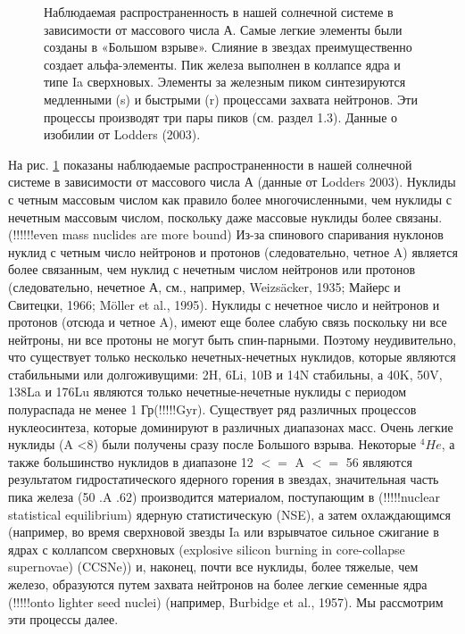 \documentclass[%
bachelor,    %
natbib,      %
subf,        %
href,        %
colorlinks,  %
]{disser}
\begin{document}
\begin{figure}[h]
	\caption{Наблюдаемая распространенность в нашей солнечной системе в зависимости от массового числа А. Самые легкие элементы были созданы в «Большом взрыве». Слияние в звездах преимущественно создает альфа-элементы. Пик железа выполнен в коллапсе ядра и типе Ia сверхновых. Элементы за железным пиком синтезируются медленными (s) и быстрыми (r) процессами захвата нейтронов. Эти процессы производят три пары пиков (см. раздел 1.3). Данные о изобилии от Lodders (2003).}
	\label{ris:1}
\end{figure}

На рис. \ref{ris:1} показаны наблюдаемые распространенности в нашей солнечной системе в зависимости от массового числа А (данные от Lodders 2003). Нуклиды с четным массовым числом как правило более многочисленными, чем нуклиды с нечетным массовым числом, поскольку даже массовые нуклиды более связаны. (!!!!!!even mass nuclides are more bound) Из-за спинового спаривания нуклонов нуклид с четным число нейтронов и протонов (следовательно, четное A) является более связанным, чем нуклид с нечетным числом нейтронов или протонов (следовательно, нечетное А, см., например, Weizsäcker, 1935; Майерс и Свитецки, 1966; Möller et al., 1995). Нуклиды с нечетное число и нейтронов и протонов (отсюда и четное A), имеют еще более слабую связь поскольку ни все нейтроны, ни все протоны не могут быть спин-парными. Поэтому неудивительно, что существует только несколько нечетных-нечетных нуклидов, которые являются стабильными или долгоживущими: 2H, 6Li, 10B и 14N стабильны, а 40K, 50V, 138La и 176Lu являются только нечетные-нечетные нуклиды с периодом полураспада не менее 1 Гр(!!!!!Gyr). Существует ряд различных процессов нуклеосинтеза, которые доминируют в различных диапазонах масс. Очень легкие нуклиды (A <8) были получены сразу после Большого взрыва. Некоторые $^4He$, а также большинство нуклидов в диапазоне 12 $<=$ A $<=$ 56 являются результатом гидростатического ядерного горения в звездах, значительная часть пика железа (50 .A .62) производится материалом, поступающим в (!!!!!nuclear statistical equilibrium) ядерную статистическую (NSE), а затем охлаждающимся (например, во время сверхновой звезды Ia или взрывчатое сильное сжигание в ядрах с коллапсом сверхновых (explosive silicon burning in core-collapse supernovae) (CCSNe)) и, наконец, почти все нуклиды, более тяжелые, чем железо, образуются путем захвата нейтронов на более легкие семенные ядра (!!!!!onto lighter seed nuclei) (например, Burbidge et al., 1957). Мы рассмотрим эти процессы далее.

\end{document}
